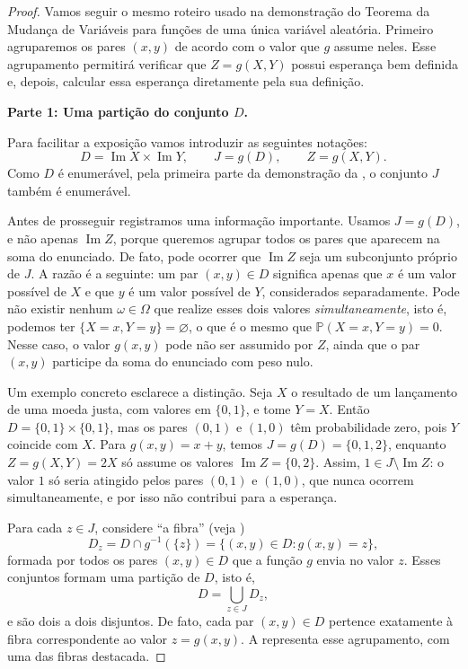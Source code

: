\documentclass[12pt,portuguese]{article}
\theoremstyle{definition}
\begin{document}
\begin{proof}
Vamos seguir o mesmo roteiro usado na demonstração do Teorema da Mudança de
Variáveis para funções de uma única variável aleatória. Primeiro agruparemos
os pares $(x,y)$ de acordo com o valor que $g$ assume neles. Esse agrupamento
permitirá verificar que $Z=g(X,Y)$ possui esperança bem definida e, depois,
calcular essa esperança diretamente pela sua definição.

\medskip
\noindent\textbf{Parte 1: Uma partição do conjunto $D$.}

Para facilitar a exposição vamos introduzir as seguintes notações:
\[
  D=\operatorname{Im}X\times\operatorname{Im}Y,
  \qquad
  J=g(D),
  \qquad
  Z=g(X,Y).
\]
Como $D$ é enumerável, pela primeira parte da demonstração da
, o conjunto $J$ também é enumerável.

\bigskip 

Antes de prosseguir registramos uma informação importante. 
Usamos $J=g(D)$, e não apenas $\operatorname{Im}Z$, porque queremos agrupar
todos os pares que aparecem na soma do enunciado. De fato, pode ocorrer que
$\operatorname{Im}Z$ seja um subconjunto próprio de $J$. A razão é a
seguinte: um par $(x,y)\in D$ significa apenas que $x$ é um valor possível
de $X$ e que $y$ é um valor possível de $Y$, considerados separadamente.
Pode não existir nenhum $\omega\in\Omega$ que realize esses dois valores
\emph{simultaneamente}, isto é, podemos ter $\{X=x,Y=y\}=\varnothing$, o
que é o mesmo que $\mathbb{P}(X=x,Y=y)=0$. Nesse caso, o valor $g(x,y)$
pode não ser assumido por $Z$, ainda que o par $(x,y)$ participe da soma
do enunciado com peso nulo. 

Um exemplo concreto esclarece a distinção. Seja $X$ o resultado de um
lançamento de uma moeda justa, com valores em $\{0,1\}$, e tome $Y=X$. Então
$D=\{0,1\}\times\{0,1\}$, mas os pares $(0,1)$ e $(1,0)$ têm probabilidade
zero, pois $Y$ coincide com $X$. Para $g(x,y)=x+y$, temos
$J=g(D)=\{0,1,2\}$, enquanto $Z=g(X,Y)=2X$ só assume os valores
$\operatorname{Im}Z=\{0,2\}$. Assim, $1\in J\setminus\operatorname{Im}Z$: o
valor $1$ só seria atingido pelos pares $(0,1)$ e $(1,0)$, que nunca ocorrem
simultaneamente, e por isso não contribui para a esperança. 

\bigskip 

Para cada $z\in J$, considere ``a fibra'' (veja )
\[
  D_z
  =D\cap g^{-1}(\{z\})
  =\bigl\{(x,y)\in D:g(x,y)=z\bigr\},
\]
formada por todos os pares $(x,y)\in D$ que a função $g$ envia no valor
$z$. Esses conjuntos formam uma partição de $D$, isto é,
\begin{equation}\label{eq:particao-g-xy}
  D=\bigcup_{z\in J}D_z,
\end{equation}
e são dois a dois disjuntos. De fato, cada par $(x,y)\in D$ pertence
exatamente à fibra correspondente ao valor $z=g(x,y)$. A
 representa esse agrupamento, com uma das
fibras destacada.


\end{proof}
\end{document}
